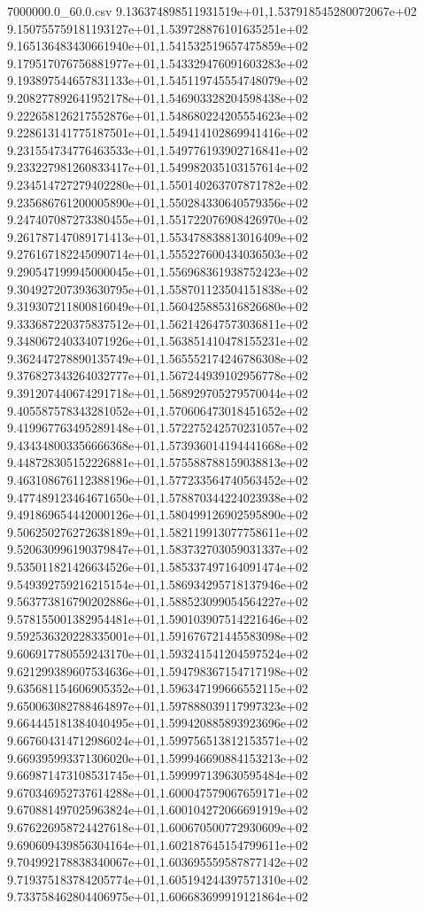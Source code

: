 \begin{filecontents*}{7000000.0_60.0.csv}
9.136374898511931519e+01,1.537918545280072067e+02
9.150755759181193127e+01,1.539728876101635251e+02
9.165136483430661940e+01,1.541532519657475859e+02
9.179517076756881977e+01,1.543329476091603283e+02
9.193897544657831133e+01,1.545119745554748079e+02
9.208277892641952178e+01,1.546903328204598438e+02
9.222658126217552876e+01,1.548680224205554623e+02
9.228613141775187501e+01,1.549414102869941416e+02
9.231554734776463533e+01,1.549776193902716841e+02
9.233227981260833417e+01,1.549982035103157614e+02
9.234514727279402280e+01,1.550140263707871782e+02
9.235686761200005890e+01,1.550284330640579356e+02
9.247407087273380455e+01,1.551722076908426970e+02
9.261787147089171413e+01,1.553478838813016409e+02
9.276167182245090714e+01,1.555227600434036503e+02
9.290547199945000045e+01,1.556968361938752423e+02
9.304927207393630795e+01,1.558701123504151838e+02
9.319307211800816049e+01,1.560425885316826680e+02
9.333687220375837512e+01,1.562142647573036811e+02
9.348067240334071926e+01,1.563851410478155231e+02
9.362447278890135749e+01,1.565552174246786308e+02
9.376827343264032777e+01,1.567244939102956778e+02
9.391207440674291718e+01,1.568929705279570044e+02
9.405587578343281052e+01,1.570606473018451652e+02
9.419967763495289148e+01,1.572275242570231057e+02
9.434348003356666368e+01,1.573936014194441668e+02
9.448728305152226881e+01,1.575588788159038813e+02
9.463108676112388196e+01,1.577233564740563452e+02
9.477489123464671650e+01,1.578870344224023938e+02
9.491869654442000126e+01,1.580499126902595890e+02
9.506250276272638189e+01,1.582119913077758611e+02
9.520630996190379847e+01,1.583732703059031337e+02
9.535011821426634526e+01,1.585337497164091474e+02
9.549392759216215154e+01,1.586934295718137946e+02
9.563773816790202886e+01,1.588523099054564227e+02
9.578155001382954481e+01,1.590103907514221646e+02
9.592536320228335001e+01,1.591676721445583098e+02
9.606917780559243170e+01,1.593241541204597524e+02
9.621299389607534636e+01,1.594798367154717198e+02
9.635681154606905352e+01,1.596347199666552115e+02
9.650063082788464897e+01,1.597888039117997323e+02
9.664445181384040495e+01,1.599420885893923696e+02
9.667604314712986024e+01,1.599756513812153571e+02
9.669395993371306020e+01,1.599946690884153213e+02
9.669871473108531745e+01,1.599997139630595484e+02
9.670346952737614288e+01,1.600047579067659171e+02
9.670881497025963824e+01,1.600104272066691919e+02
9.676226958724427618e+01,1.600670500772930609e+02
9.690609439856304164e+01,1.602187645154799611e+02
9.704992178838340067e+01,1.603695559587877142e+02
9.719375183784205774e+01,1.605194244397571310e+02
9.733758462804406975e+01,1.606683699919121864e+02

\end{filecontents*}
